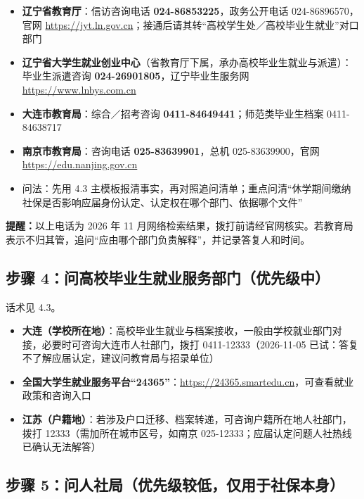 \documentclass[UTF8,fontset=fandol,zihao=-4]{ctexart}
\begin{document}
\begin{itemize}
  \item \textbf{辽宁省教育厅}：信访咨询电话 \textbf{024-86853225}，政务公开电话 024-86896570，官网 \url{https://jyt.ln.gov.cn}；接通后请其转“高校学生处／高校毕业生就业”对口部门
  \item \textbf{辽宁省大学生就业创业中心}（省教育厅下属，承办高校毕业生就业与派遣）：毕业生派遣咨询 \textbf{024-26901805}，辽宁毕业生服务网 \url{https://www.lnbys.com.cn}
  \item \textbf{大连市教育局}：综合／招考咨询 \textbf{0411-84649441}；师范类毕业生档案 0411-84638717
  \item \textbf{南京市教育局}：咨询电话 \textbf{025-83639901}，总机 025-83639900，官网 \url{https://edu.nanjing.gov.cn}
  \item 问法：先用 4.3 主模板报清事实，再对照追问清单；重点问清“休学期间缴纳社保是否影响应届身份认定、认定权在哪个部门、依据哪个文件”
\end{itemize}

\begin{notebox}
\small \textbf{提醒：}以上电话为 2026 年 11 月网络检索结果，拨打前请经官网核实。若教育局表示不归其管，追问“应由哪个部门负责解释”，并记录答复人和时间。
\end{notebox}

\subsection{步骤 4：问高校毕业生就业服务部门（优先级中）}

话术见 4.3。

\begin{itemize}
  \item \textbf{大连（学校所在地）}：高校毕业生就业与档案接收，一般由学校就业部门对接，必要时可咨询大连市人社部门，拨打 0411-12333（2026-11-05 已试：答复不了解应届认定，建议问教育局与招录单位）
  \item \textbf{全国大学生就业服务平台“24365”}：\url{https://24365.smartedu.cn}，可查看就业政策和咨询入口
  \item \textbf{江苏（户籍地）}：若涉及户口迁移、档案转递，可咨询户籍所在地人社部门，拨打 12333（需加所在城市区号，如南京 025-12333；应届认定问题人社热线已确认无法解答）
\end{itemize}

\subsection{步骤 5：问人社局（优先级较低，仅用于社保本身）}
\end{document}
